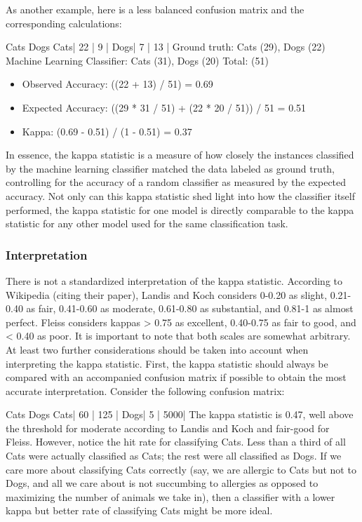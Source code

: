 \documentclass[caret-main.tex]{subfiles}
\begin{document}
As another example, here is a less balanced confusion matrix and the corresponding calculations:

     Cats Dogs
Cats| 22 | 9  |
Dogs| 7  | 13 |
Ground truth: Cats (29), Dogs (22) 
Machine Learning Classifier: Cats (31), Dogs (20) 
Total: (51) 

\begin{itemize}
\item Observed Accuracy: ((22 + 13) / 51) = 0.69 
\item Expected Accuracy: ((29 * 31 / 51) + (22 * 20 / 51)) / 51 = 0.51 
\item Kappa: (0.69 - 0.51) / (1 - 0.51) = 0.37
\end{itemize}
In essence, the kappa statistic is a measure of how closely the instances classified by the machine learning classifier matched the data labeled as ground truth, controlling for the accuracy of a random classifier as measured by the expected accuracy. Not only can this kappa statistic shed light into how the classifier itself performed, the kappa statistic for one model is directly comparable to the kappa statistic for any other model used for the same classification task.

\subsubsection{Interpretation}

There is not a standardized interpretation of the kappa statistic. According to Wikipedia (citing their paper), Landis and Koch considers 0-0.20 as slight, 0.21-0.40 as fair, 0.41-0.60 as moderate, 0.61-0.80 as substantial, and 0.81-1 as almost perfect. Fleiss considers kappas > 0.75 as excellent, 0.40-0.75 as fair to good, and < 0.40 as poor. It is important to note that both scales are somewhat arbitrary. At least two further considerations should be taken into account when interpreting the kappa statistic. First, the kappa statistic should always be compared with an accompanied confusion matrix if possible to obtain the most accurate interpretation. Consider the following confusion matrix:

     Cats Dogs
Cats| 60 | 125 |
Dogs| 5  | 5000|
\newpage
The kappa statistic is 0.47, well above the threshold for moderate according to Landis and Koch and fair-good for Fleiss. However, notice the hit rate for classifying Cats. Less than a third of all Cats were actually classified as Cats; the rest were all classified as Dogs. If we care more about classifying Cats correctly (say, we are allergic to Cats but not to Dogs, and all we care about is not succumbing to allergies as opposed to maximizing the number of animals we take in), then a classifier with a lower kappa but better rate of classifying Cats might be more ideal.
\end{document}
